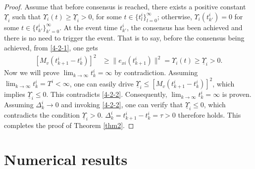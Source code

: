 \documentclass[review]{elsarticle}
\begin{document}
\begin{proof}
	Assume that before consensus is reached, there exists a positive constant $\underline{\varUpsilon}_i$ such that $\varUpsilon_i (t)\geq \underline{\varUpsilon}_i>0 $, for some $t\in \{t_l^i \}_{l=0}^{\infty}$; otherwise, $\varUpsilon_i (t_{k'}^i) =0$ for some $t\in \{t_{k'}^i \}_{k'=0}^{\infty}$. At the event time $t_{k'}^i$, the consensus has been achieved and there is no need to trigger the event.  That is to say, before the consensus being achieved, from \eqref{4-2-1}, one gets
	\begin{equation}\label{4-2-2}
	\begin{split}
	\left[M_v(t_{k+1}^i - t_k^i) \right]^2& \geq \|e_{xi}(t_{k+1}^i)\|^2 =  {\varUpsilon_i(t)}\geq{\underline{\varUpsilon}_i}>0.
	\end{split}
	\end{equation}
	Now we will prove $\lim_{k\rightarrow \infty}t_k^i = \infty$ by contradiction. Assuming $\lim_{k\rightarrow \infty}t_k^i =T^i< \infty$, one can easily drive
	$
	{\underline{\varUpsilon}_i} \leq   \left[M_v(t_{k+1}^i - t_k^i) \right]^2
	$, which implies ${\underline{\varUpsilon}_i}\leq0$. This contradicts \eqref{4-2-2}. Consequently, $\lim_{k\rightarrow \infty}t_k^i = \infty$ is proven. 
	Assuming $\Delta_{k}^i \rightarrow 0$ and invoking \eqref{4-2-2}, one can verify that $ \underline{\varUpsilon}_i \leq0$, which contradicts the condition $\underline{\varUpsilon}_i>0$. $\Delta_{k}^i = t_{k+1}^i - t_{k}^i = \tau>0$ therefore holds.
	This completes the proof of Theorem \ref{thm2}. 
\end{proof}


\section{Numerical results}\label{simu}
\end{document}

